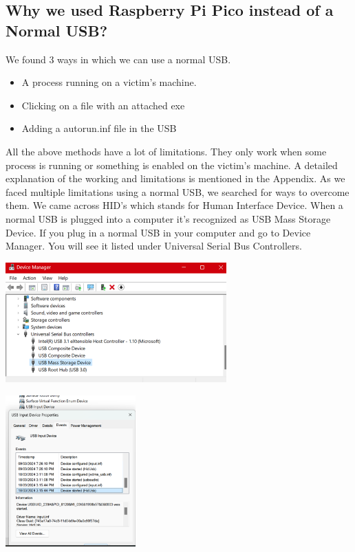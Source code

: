 \documentclass[11pt]{report}
\begin{document}
\subsection*{Why we used Raspberry Pi Pico instead of a Normal USB?}

We found 3 ways in which we can use a normal USB.
\begin{itemize}
  \item A process running on a victim's machine.  
  \item Clicking on a file with an attached exe
  \item Adding a autorun.inf file in the USB
\end{itemize}

All the above methods have a lot of limitations. They only work when some
process is running or something is enabled on the victim's machine. A detailed
explanation of the working and limitations is mentioned in the Appendix. As we
faced multiple limitations using a normal USB, we searched for ways to overcome
them. We came across HID's which stands for Human Interface Device. When a
normal USB is plugged into a computer it's recognized as USB Mass Storage
Device. If you plug in a normal USB in your computer and go to Device Manager.
You will see it listed under Universal Serial Bus Controllers.
\\[1em]
\begin{minipage}{0.5\linewidth}
  \centering
  \includegraphics[width=8.5cm]{Figures/Device.png}
  \label{fig:gns3}
  \end{minipage}
  \hfil
  \begin{minipage}{0.5\linewidth}
    \centering
    \includegraphics[width=5cm]{Figures/hid.png}
\end{minipage}
\end{document}
